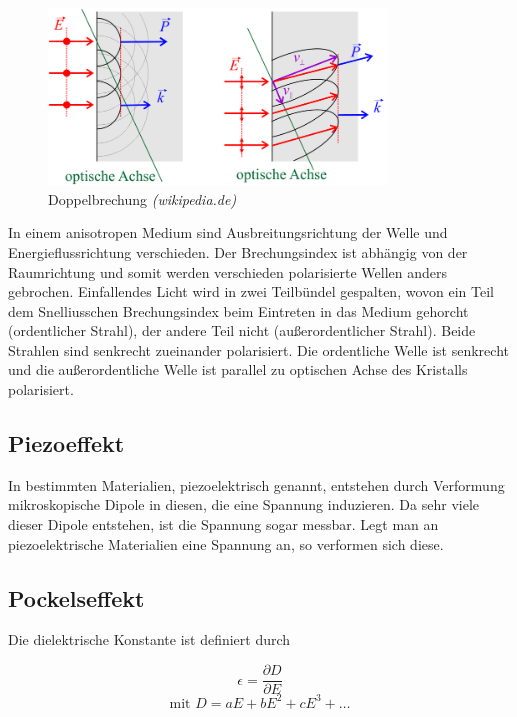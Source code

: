 \begin{figure}[H]
	\centering \includegraphics[width = 0.8\textwidth]{Bilder/Doppelbrechung.jpg}
	\caption{Doppelbrechung \emph{(wikipedia.de)}}
\end{figure}

In einem anisotropen Medium sind Ausbreitungsrichtung der Welle und Energieflussrichtung verschieden. Der Brechungsindex ist abhängig von der Raumrichtung und somit werden verschieden polarisierte Wellen anders gebrochen. Einfallendes Licht wird in zwei Teilbündel gespalten, wovon ein Teil dem Snelliusschen Brechungsindex beim Eintreten in das Medium gehorcht (ordentlicher Strahl), der andere Teil nicht (außerordentlicher Strahl). Beide Strahlen sind senkrecht zueinander polarisiert. Die ordentliche Welle ist senkrecht und die außerordentliche Welle ist parallel zu optischen Achse des Kristalls polarisiert.


\subsection{Piezoeffekt}

In bestimmten Materialien, piezoelektrisch genannt, entstehen durch Verformung mikroskopische Dipole in diesen, die eine Spannung induzieren. Da sehr viele dieser Dipole entstehen, ist die Spannung sogar messbar. Legt man an piezoelektrische Materialien eine Spannung an, so verformen sich diese.


\subsection{Pockelseffekt}

Die dielektrische Konstante ist definiert durch 

\begin{equation} \epsilon = \frac{\partial D}{\partial E}  \end{equation}
\begin{equation} \text{mit \ } D = aE + bE^2 + cE^3 + \dots \end{equation}

